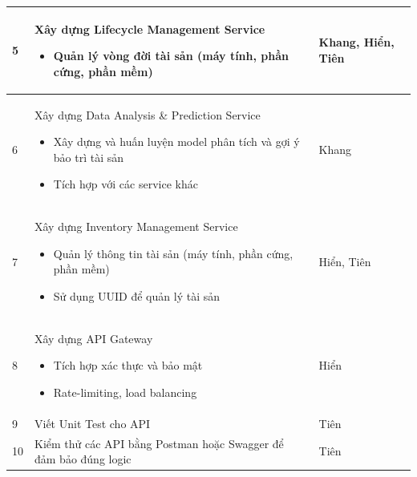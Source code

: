 \begin{itemize}
\begin{table}[H]
\begin{tabular}{|p{1cm}|p{8cm}|p{4cm}|}
        \hline
        5 & Xây dựng Lifecycle Management Service 
        \begin{itemize}
            \item Quản lý vòng đời tài sản (máy tính, phần cứng, phần mềm)
        \end{itemize} & Khang, Hiển, Tiên \\
        \hline
        6 & Xây dựng Data Analysis \& Prediction Service 
        \begin{itemize}
            \item Xây dựng và huấn luyện model phân tích và gợi ý bảo trì tài sản
            \item Tích hợp với các service khác
        \end{itemize} & Khang \\
        \hline
        7 & Xây dựng Inventory Management Service 
        \begin{itemize}
            \item Quản lý thông tin tài sản (máy tính, phần cứng, phần mềm)
            \item Sử dụng UUID để quản lý tài sản
        \end{itemize} & Hiển, Tiên \\
        \hline
        8 & Xây dựng API Gateway 
        \begin{itemize}
            \item Tích hợp xác thực và bảo mật
            \item Rate-limiting, load balancing
        \end{itemize} & Hiển \\
        \hline
        9 & Viết Unit Test cho API & Tiên \\
        \hline
        10 & Kiểm thử các API bằng Postman hoặc Swagger để đảm bảo đúng logic & Tiên \\
        \hline
    \end{tabular}
\end{table}


\end{itemize}
